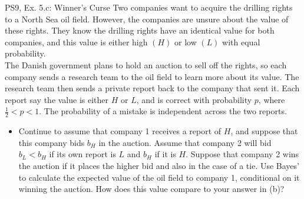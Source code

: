 \begin{frame}{PS9, Ex. 5.c: Winner's Curse}
      Two companies want to acquire the drilling rights to a North Sea oil field. However, the companies are unsure about the value of these rights. They know the drilling rights have an identical value for both companies, and this value is either high $(H)$ or low $(L)$ with equal probability.\\\smallskip
      The Danish government plans to hold an auction to sell off the rights, so each company sends a research team to the oil field to learn more about its value. The research team then sends a private report back to the company that sent it. Each report say the value is either $H$ or $L$, and is correct with probability $p$, where $\frac{1}{2} < p < 1$. The probability of a mistake is independent across the two reports.
      \vspace{-2pt}
      \begin{itemize}
        \item[(c)] Continue to assume that company 1 receives a report of $H$, and suppose that this company bids $b_H$ in the auction. Assume that company 2 will bid $b_L < b_H$ if its own report is $L$ and $b_H$ if it is $H$. Suppose that company 2 wins the auction if it places the higher bid and also in the case of a tie. Use Bayes’ to calculate the expected value of the oil field to company 1, conditional on it winning the auction. How does this value compare to your answer in (b)?
        \end{itemize}
      \vfill\null
\end{frame}
